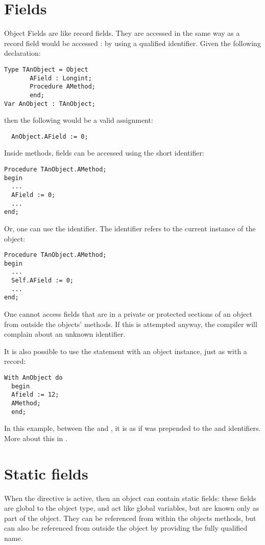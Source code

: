 \section{Fields}
Object Fields are like record fields. They are accessed in the same way as
a record field  would be accessed : by using a qualified identifier. Given the
following declaration:
\begin{verbatim}
Type TAnObject = Object
       AField : Longint;
       Procedure AMethod;
       end;
Var AnObject : TAnObject;
\end{verbatim}
then the following would be a valid assignment:
\begin{verbatim}
  AnObject.AField := 0;
\end{verbatim}
Inside methods, fields can be accessed using the short identifier:
\begin{verbatim}
Procedure TAnObject.AMethod;
begin
  ...
  AField := 0;
  ...
end;
\end{verbatim}
Or, one can use the  identifier. The  identifier refers
to the current instance of the object:
\begin{verbatim}
Procedure TAnObject.AMethod;
begin
  ...
  Self.AField := 0;
  ...
end;
\end{verbatim}
One cannot access fields that are in a private or protected sections of an object from
outside the objects' methods. If this is attempted anyway, the compiler will complain about
an unknown identifier.

It is also possible to use the  statement with an object instance,
just as with a record:
\begin{verbatim}
With AnObject do
  begin
  Afield := 12;
  AMethod;
  end;
\end{verbatim}
In this example, between the  and , it is as if
 was prepended to the  and 
identifiers. More about this in .

\section{Static fields}
When the  directive is active, then an object
can contain static fields: these fields are global to the object type, and act
like global variables, but are known only as part of the object. They can be
referenced from within the objects methods, but can also be referenced from
outside the object by providing the fully qualified name.

